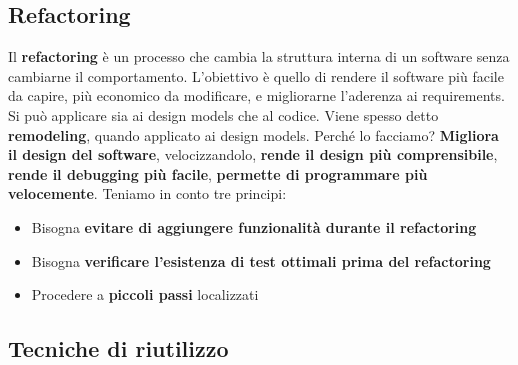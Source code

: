 \documentclass[11pt]{article}
\begin{document}
\subsection{Refactoring}
Il \textbf{refactoring} è un processo che cambia la struttura interna di un software senza cambiarne il comportamento. L'obiettivo è quello di rendere il software più facile da capire, più economico da modificare, e migliorarne l'aderenza ai requirements. Si può applicare sia ai design models che al codice. Viene spesso detto \textbf{remodeling}, quando applicato ai design models. Perché lo facciamo? \textbf{Migliora il design del software}, velocizzandolo, \textbf{rende il design più comprensibile}, \textbf{rende il debugging più facile}, \textbf{permette di programmare più velocemente}. Teniamo in conto tre principi:
\begin{itemize}
    \item Bisogna \textbf{evitare di aggiungere funzionalità durante il refactoring}
    \item Bisogna \textbf{verificare l'esistenza di test ottimali prima del refactoring}
    \item Procedere a \textbf{piccoli passi} localizzati
\end{itemize}
\subsection{Tecniche di riutilizzo}
\end{document}
